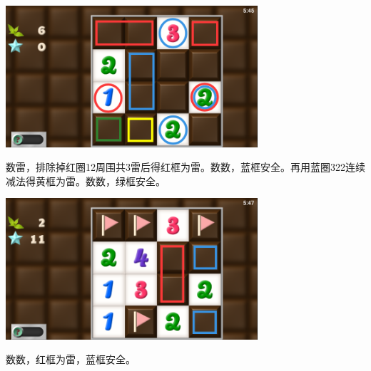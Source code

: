 \subsection{} %
\begin{center}
    \includegraphics[width=0.7\textwidth]{puzzle/64-1.png}
\end{center}
数雷，排除掉红圈12周围共3雷后得红框为雷。数数，蓝框安全。再用蓝圈322连续减法得黄框为雷。数数，绿框安全。
\begin{center}
    \includegraphics[width=0.7\textwidth]{puzzle/64-2.png}
\end{center}
数数，红框为雷，蓝框安全。

